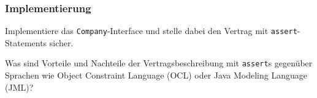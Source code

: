 \documentclass{beamer}
\begin{document}
\begin{frame}
  \frametitle{Implementierung}
  Implementiere das \lstinline{Company}-Interface
  und stelle dabei den Vertrag mit \lstinline{assert}-Statements sicher.
  
  Was sind Vorteile und Nachteile der Vertragsbeschreibung mit \lstinline{assert}s
  gegenüber Sprachen wie Object Constraint Language (OCL) oder Java Modeling Language (JML)?
\end{frame}
\end{document}
